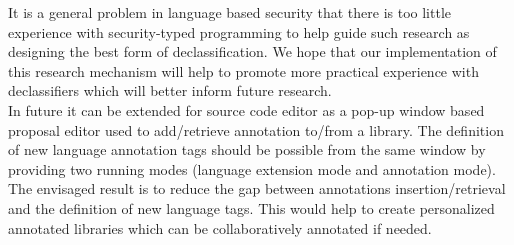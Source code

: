 It is a general problem in language based security that there is too little experience with security-typed programming to help guide such research as designing the best
form of declassification. We hope that our implementation of this research
mechanism will help to promote more practical experience
with declassifiers which will better inform future research.\\

In future it can be extended for source code editor as
a pop-up window based proposal editor used to add/retrieve
annotation to/from a library. The definition of new language
annotation tags should be possible from the same window by
providing two running modes (language extension mode and
annotation mode). The envisaged result is to reduce the gap
between annotations insertion/retrieval and the definition of
new language tags. This would help to create personalized
annotated libraries which can be collaboratively annotated if
needed.